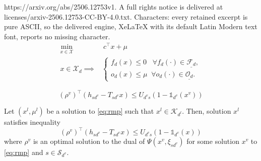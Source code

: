 \documentclass[10pt,a4paper]{amsart}
\def\Ind{\ensuremath{\mathbb{1}}}
\newcommand{\mtc}[1] {\mathcal{#1}}
\begin{document}
https://arxiv.org/abs/2506.12753v1. A full rights notice is delivered at licenses/arxiv-2506.12753-CC-BY-4.0.txt. Characters: every retained excerpt is pure ASCII, so the delivered engine, XeLaTeX with its default Latin Modern text font, reports no missing character.
\begin{subequations}\label{eq:rmp}
\begin{align}
     \min_{x\in \mtc{X}} & ~c^\top x+\mu \\
     \label{eq:rmp:imp}x \in \mtc{X}_{d}  \implies &
     \begin{cases}
     	f_{d}(x) \leq 0 \;\;\; \forall f_{d}(\cdot) \in \underline{\mtc{F}_{d}}, \\
	o_{d}(x) \leq \mu \;\; \forall o_{d}(\cdot) \in \underline{\mtc{O}_{d}}.
     \end{cases}
\end{align}
\end{subequations}

\begin{equation}\label{eq:continuous:fc}
    (\rho^v)^\top(h_{sd^v}-T_{sd^v}x)\leq U_{d^vs}(1-\Ind_{d^v}(x^v))
\end{equation}

\begin{theorem}\label{prop:fc:continuous:safe}
Let $(x^l,\mu^l)$ be a solution to \eqref{eq:rmp} such that $x^l\in\mtc{K}_{d^l}$.
Then, solution $x^l$ satisfies inequality
\begin{equation*}
    (\rho^v)^\top(h_{sd^v}-T_{sd^v}x)\leq U_{d^vs}(1-\Ind_{d^v}(x))
\end{equation*}
where $\rho^v$ is an optimal solution to the dual of $\Psi(x^v,\xi_{sd^v})$ for some solution $x^v$ to \eqref{eq:rmp} and $s\in\mtc{S}_{d^v}$.
\end{theorem}
\end{document}

